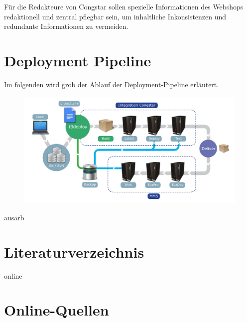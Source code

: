 \documentclass[11pt,a4paper]{article} %
\begin{document}
Für die Redakteure von Congstar sollen spezielle Informationen des Webshops redaktionell und zentral pflegbar sein, 
um inhaltliche Inkonsistenzen und redundante Informationen zu vermeiden. 

\section{Deployment Pipeline} \label{sec:pipeline}

Im folgenden wird grob der Ablauf der Deployment-Pipeline erl{\"a}utert. 
\begin{figure}[h]
\includegraphics[width=\textwidth]{images/DeploymentPipeline.pdf}
\centering
\end{figure}



\newpage


\newpage


%

\begin{btSect}{ausarb}
\section*{Literaturverzeichnis}
\btPrintCited
\end{btSect}
\begin{btSect}{online}
\section*{Online-Quellen}
\btPrintCited
\end{btSect}
\end{document}
